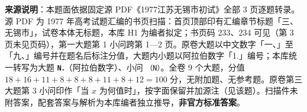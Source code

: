 


\begin{gktip}
\textbf{来源说明}：本题面依据固定源 PDF《1977江苏无锡市初试》全部 3 页逐题转录。源 PDF 为 1977 年高考试题汇编的书页扫描：首页顶部印有汇编章节标题「三、无锡市」，试卷本体无标题，本库 H1 为编者拟定；书页码 233、234 可见（第 3 页未见页码），第一大题第 1 小问跨第 1—2 页。原卷大题以中文数字「一、」至「九、」编号并在题名后标注分值，大题内小题以阿拉伯数字「1.」编号；本库统一转写为大题 \texttt{\textbf{N．}}（阿拉伯数字）、小问 \texttt{（N）}。全卷 9 个大题，分值 $18+16+11+8+8+8+11+8+12=100$ 分，无附加题、无参考题。原卷第三大题第 3 小问印作「当 $x$ 为何值时」，按字面保留并加源注（见该题）。扫描件未附答案，配套答案与解析为本库编者独立推导，\textbf{非官方标准答案}。
\end{gktip}

\par\medskip

